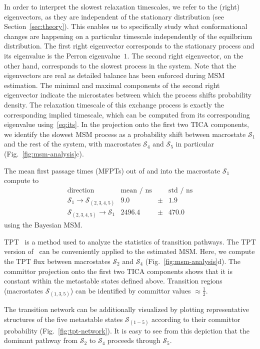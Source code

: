 \documentclass[9pt,tutorial]{livecoms}
\begin{document}
In order to interpret the slowest relaxation timescales, we refer to the (right) eigenvectors,
as they are independent of the stationary distribution (see Section~\ref{sec:theory}).
This enables us to specifically study what conformational changes are happening on a particular timescale independently of the equilbrium distribution.
The first right eigenvector corresponds to the stationary process and its eigenvalue is the Perron eigenvalue~$1$.
The second right eigenvector, on the other hand, corresponds to the slowest process in the system. 
Note that the eigenvectors are real as detailed balance has been enforced during MSM estimation.
The minimal and maximal components of the second right eigenvector indicate the microstates between which the process shifts probability density.
The relaxation timescale of this exchange process is exactly the corresponding implied timescale,
which can be computed from its corresponding eigenvalue using~\eqref{eq:its}.
In the projection onto the first two TICA components,
we identify the slowest MSM process as a probability shift between macrostate $\mathcal{S}_1$ and the rest of the system,
with macrostates $\mathcal{S}_4$ and $\mathcal{S}_5$ in particular (Fig.~\ref{fig:msm-analysis}c).

The mean first passage times (MFPTs) out of and into the macrostate $\mathcal{S}_1$ compute to
\[ \begin{array}{crcr}
\textrm{direction} & \textrm{mean / ns} && \textrm{std / ns} \\
\hline
\mathcal{S}_1 \to \mathcal{S}_{(2,3,4,5)} & 9.0 & \pm & 1.9 \\
\mathcal{S}_{(2,3,4,5)} \to \mathcal{S}_1 & 2496.4 & \pm &  470.0
\end{array}\]
using the Bayesian MSM.

TPT~\cite{weinan-tpt,metzner-msm-tpt} is a method used to analyze the statistics of transition pathways.
The TPT version of~\cite{noe-folding-pathways} can be conveniently applied to the estimated MSM.
Here, we compute the TPT flux between macrostates $\mathcal{S}_2$ and $\mathcal{S}_4$ (Fig.~\ref{fig:msm-analysis}d).
The committor projection onto the first two TICA components shows that it is constant within the metastable states defined above.
Transition regions (macrostates $\mathcal{S}_{(1,3,5)}$) can be identified by committor values $\approx \frac{1}{2}$.

The transition network can be additionally visualized by plotting representative structures of the five metastable states $\mathcal{S}_{(1-5)}$ according to their committor probability (Fig.~\ref{fig:tpt-network}).
It is easy to see from this depiction that the dominant pathway from $\mathcal{S}_2$ to $\mathcal{S}_4$ proceeds through $\mathcal{S}_5$.
\end{document}
